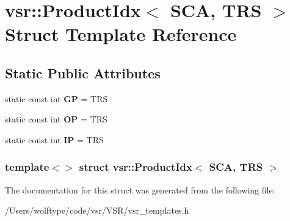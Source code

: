 \hypertarget{structvsr_1_1_product_idx_3_01_s_c_a_00_01_t_r_s_01_4}{\section{vsr\-:\-:Product\-Idx$<$ S\-C\-A, T\-R\-S $>$ Struct Template Reference}
\label{structvsr_1_1_product_idx_3_01_s_c_a_00_01_t_r_s_01_4}
}
\subsection*{Static Public Attributes}
\begin{DoxyCompactItemize}
\item 
\hypertarget{structvsr_1_1_product_idx_3_01_s_c_a_00_01_t_r_s_01_4_aac94bceb0f0bd539f24b9223b3c61f4e}{static const int {\bfseries G\-P} = T\-R\-S}\label{structvsr_1_1_product_idx_3_01_s_c_a_00_01_t_r_s_01_4_aac94bceb0f0bd539f24b9223b3c61f4e}

\item 
\hypertarget{structvsr_1_1_product_idx_3_01_s_c_a_00_01_t_r_s_01_4_a0d3d69f914d8f1a4fb31cd7fd01ee7f9}{static const int {\bfseries O\-P} = T\-R\-S}\label{structvsr_1_1_product_idx_3_01_s_c_a_00_01_t_r_s_01_4_a0d3d69f914d8f1a4fb31cd7fd01ee7f9}

\item 
\hypertarget{structvsr_1_1_product_idx_3_01_s_c_a_00_01_t_r_s_01_4_acd89104fe45fa1b2fe2b2ea4ddc0e4f5}{static const int {\bfseries I\-P} = T\-R\-S}\label{structvsr_1_1_product_idx_3_01_s_c_a_00_01_t_r_s_01_4_acd89104fe45fa1b2fe2b2ea4ddc0e4f5}

\end{DoxyCompactItemize}
\subsubsection*{template$<$$>$ struct vsr\-::\-Product\-Idx$<$ S\-C\-A, T\-R\-S $>$}



The documentation for this struct was generated from the following file\-:\begin{DoxyCompactItemize}
\item 
/\-Users/wolftype/code/vsr/\-V\-S\-R/vsr\-\_\-templates.\-h\end{DoxyCompactItemize}
